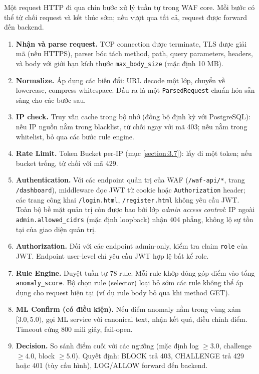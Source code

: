 \documentclass[../DoAn.tex]{subfiles}
\begin{document}
Một request HTTP đi qua chín bước xử lý tuần tự trong WAF core. Mỗi bước
có thể từ chối request và kết thúc sớm; nếu vượt qua tất cả, request được
forward đến backend.

\begin{enumerate}[leftmargin=*]
    \item \textbf{Nhận và parse request.} TCP connection được terminate, TLS
    được giải mã (nếu HTTPS), parser bóc tách method, path, query parameters,
    headers, và body với giới hạn kích thước \texttt{max\_body\_size}
    (mặc định 10 MB).

    \item \textbf{Normalize.} Áp dụng các biến đổi: URL decode một lớp,
    chuyển về lowercase, compress whitespace. Đầu ra là một \texttt{ParsedRequest}
    chuẩn hóa sẵn sàng cho các bước sau.

    \item \textbf{IP check.} Truy vấn cache trong bộ nhớ (đồng bộ định kỳ
    với PostgreSQL): nếu IP nguồn nằm trong blacklist, từ chối ngay với mã
    403; nếu nằm trong whitelist, bỏ qua các bước rule engine.

    \item \textbf{Rate Limit.} Token Bucket per-IP (mục \ref{section:3.7}):
    lấy đi một token; nếu bucket trống, từ chối với mã 429.

    \item \textbf{Authentication.} Với các endpoint quản trị của WAF
    (\texttt{/waf-api/*}, trang \texttt{/dashboard}), middleware đọc JWT từ
    cookie hoặc \texttt{Authorization} header; các trang công khai
    \texttt{/login.html}, \texttt{/register.html} không yêu cầu JWT. Toàn bộ
    bề mặt quản trị còn được bao bởi lớp \textit{admin access control}: IP
    ngoài \texttt{admin.allowed\_cidrs} (mặc định loopback) nhận 404 phẳng,
    không lộ sự tồn tại của giao diện quản trị.

    \item \textbf{Authorization.} Đối với các endpoint admin-only, kiểm
    tra claim \texttt{role} của JWT. Endpoint user-level chỉ yêu cầu JWT
    hợp lệ bất kể role.

    \item \textbf{Rule Engine.} Duyệt tuần tự 78 rule. Mỗi rule khớp đóng
    góp điểm vào tổng \texttt{anomaly\_score}. Bộ chọn rule (selector) loại
    bỏ sớm các rule không thể áp dụng cho request hiện tại (ví dụ rule body
    bỏ qua khi method GET).

    \item \textbf{ML Confirm (có điều kiện).} Nếu điểm anomaly nằm trong
    vùng xám \([3.0, 5.0)\), gọi ML service với canonical text, nhận kết
    quả, điều chỉnh điểm. Timeout cứng 800 mili giây, fail-open.

    \item \textbf{Decision.} So sánh điểm cuối với các ngưỡng (mặc định
    log \(\ge 3.0\), challenge \(\ge 4.0\), block \(\ge 5.0\)). Quyết định:
    BLOCK trả 403, CHALLENGE trả 429 hoặc 401 (tùy cấu hình), LOG/ALLOW
    forward đến backend.
\end{enumerate}
\end{document}
